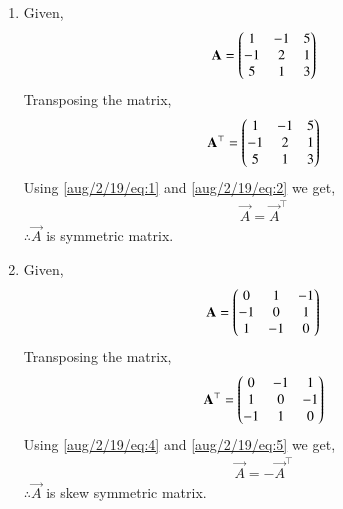 \begin{enumerate}
    \item Given,
    \begin{align}
    \label{aug/2/19/eq:1}
        \mathbf{A}=\begin{pmatrix}1 & -1 & 5\\ -1 & 2 & 1\\5 & 1 & 3\end{pmatrix}
    \end{align}
    Transposing the matrix,
    \begin{align}
        \label{aug/2/19/eq:2}
        \mathbf{A}^\top=\begin{pmatrix}1 & -1 & 5 \\-1 & 2 & 1\\5 & 1 &3\end{pmatrix}
    \end{align}
    Using \eqref{aug/2/19/eq:1} and \eqref{aug/2/19/eq:2} we get,
    \begin{align}
        \vec{A}=\vec{A}^\top
    \end{align}
        $\therefore \vec{A}$ is symmetric matrix. 
        
    \item Given,
    \begin{align}
    \label{aug/2/19/eq:4}
        \mathbf{A}=\begin{pmatrix}0 & 1 & -1\\ -1 & 0 & 1\\1 & -1 & 0\end{pmatrix}
    \end{align}
    Transposing the matrix,
    \begin{align}
        \label{aug/2/19/eq:5}
        \mathbf{A}^\top=\begin{pmatrix}0 & -1 & 1 \\1 & 0 & -1\\-1 & 1 & 0\end{pmatrix}
    \end{align}
    Using \eqref{aug/2/19/eq:4} and \eqref{aug/2/19/eq:5} we get,
    \begin{align}
        \vec{A}=-\vec{A}^\top
    \end{align}
        $\therefore \vec{A}$ is skew symmetric matrix. 
    \end{enumerate}